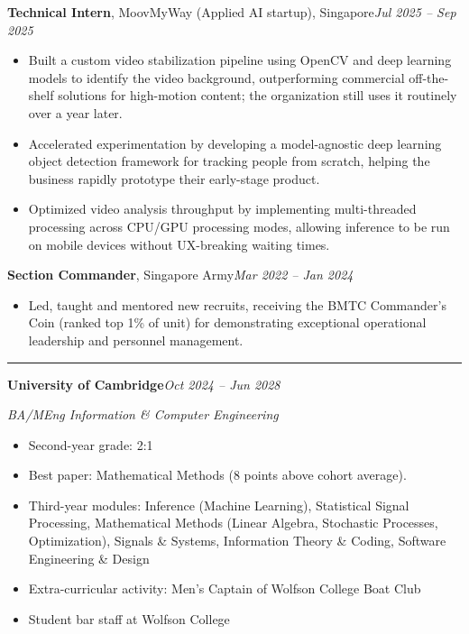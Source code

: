 \documentclass[11pt]{article}
\newcommand{\cvsection}[1]{%
  \vspace{10pt}%
  \noindent{\large\bfseries\MakeUppercase{#1}}\par
  \vspace{-4pt}\noindent\rule{\linewidth}{0.7pt}\vspace{4pt}%
}
\begin{document}
\vspace{4pt}
\noindent\textbf{Technical Intern}, MoovMyWay (Applied AI startup), Singapore\hfill\textit{Jul 2025 -- Sep 2025}\par
\begin{itemize}
  \item Built a custom video stabilization pipeline using OpenCV and deep learning models to identify the video background, outperforming commercial off-the-shelf solutions for high-motion content; the organization still uses it routinely over a year later.
  \item Accelerated experimentation by developing a model-agnostic deep learning object detection framework for tracking people from scratch, helping the business rapidly prototype their early-stage product.
  \item Optimized video analysis throughput by implementing multi-threaded processing across CPU/GPU processing modes, allowing inference to be run on mobile devices without UX-breaking waiting times.
\end{itemize}

\vspace{4pt}
\noindent\textbf{Section Commander}, Singapore Army\hfill\textit{Mar 2022 -- Jan 2024}\par
\begin{itemize}
  \item Led, taught and mentored new recruits, receiving the BMTC Commander's Coin (ranked top 1\% of unit) for demonstrating exceptional operational leadership and personnel management.
\end{itemize}

\cvsection{Education}

\noindent\textbf{University of Cambridge}\hfill\textit{Oct 2024 -- Jun 2028}\par
\textit{BA/MEng Information \& Computer Engineering}
\begin{itemize}
  \item Second-year grade: 2:1
  \item Best paper: Mathematical Methods (8 points above cohort average).
  \item Third-year modules: Inference (Machine Learning), Statistical Signal Processing, Mathematical Methods (Linear Algebra, Stochastic Processes, Optimization), Signals \& Systems, Information Theory \& Coding, Software Engineering \& Design
  \item Extra-curricular activity: Men's Captain of Wolfson College Boat Club
  \item Student bar staff at Wolfson College
\end{itemize}
\end{document}
